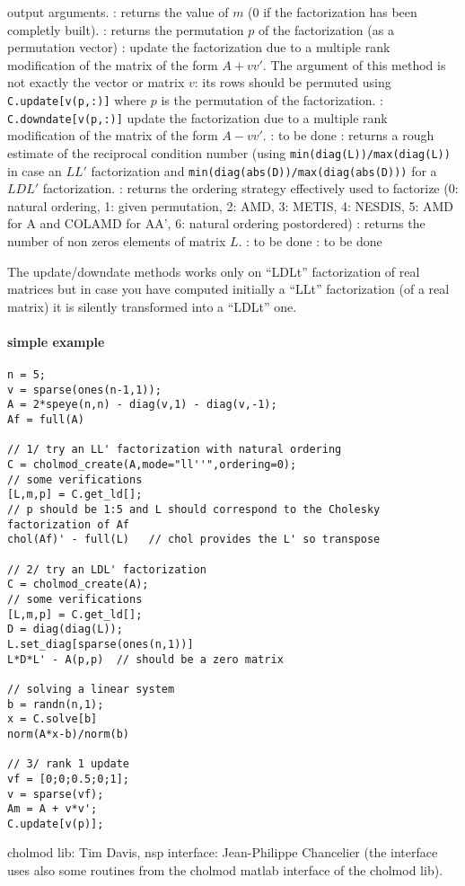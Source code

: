 \begin{varlist}
        output arguments.
  : returns the value of $m$ (0 if the factorization has been completly built).
  : returns the permutation $p$ of the factorization (as a permutation vector)         
  : update the factorization due to a multiple rank modification
        of the matrix of the form $A + vv'$. The argument of this method is not exactly the vector
        or matrix $v$: its rows should be permuted using \verb+C.update[v(p,:)]+ where $p$ is 
        the permutation of the factorization.
  : \verb+C.downdate[v(p,:)]+ update the factorization due to a multiple rank modification
        of the matrix of the form $A - vv'$.
  : to be done          
  : returns a rough estimate of the reciprocal condition number (using 
        \verb+min(diag(L))/max(diag(L))+ in case an $LL'$ factorization and 
        \verb+min(diag(abs(D))/max(diag(abs(D)))+ for a $LDL'$ factorization.
  : returns the ordering strategy effectively used to factorize
                        (0: natural ordering, 1: given permutation, 2: AMD, 3: METIS, 4: NESDIS, 5: AMD for A and COLAMD
  for AA', 6: natural ordering postordered)      
  : returns the number of non zeros elements of matrix $L$.        
  : to be done            
  : to be done         
\end{varlist}

The update/downdate methods works only on ``LDLt'' factorization of real matrices but in case you have 
computed initially a ``LLt'' factorization (of a real matrix) it is silently transformed into a ``LDLt'' one.
 
\begin{examples}
 \paragraph{simple example}
  \begin{Verbatim}
n = 5;
v = sparse(ones(n-1,1));
A = 2*speye(n,n) - diag(v,1) - diag(v,-1);
Af = full(A)

// 1/ try an LL' factorization with natural ordering
C = cholmod_create(A,mode="ll''",ordering=0);
// some verifications
[L,m,p] = C.get_ld[];
// p should be 1:5 and L should correspond to the Cholesky factorization of Af
chol(Af)' - full(L)   // chol provides the L' so transpose

// 2/ try an LDL' factorization
C = cholmod_create(A);
// some verifications
[L,m,p] = C.get_ld[];
D = diag(diag(L));
L.set_diag[sparse(ones(n,1))]
L*D*L' - A(p,p)  // should be a zero matrix 

// solving a linear system
b = randn(n,1);
x = C.solve[b]
norm(A*x-b)/norm(b)

// 3/ rank 1 update
vf = [0;0;0.5;0;1];
v = sparse(vf);
Am = A + v*v';
C.update[v(p)];

  \end{Verbatim}
 \end{examples}

\begin{authors}
   cholmod lib: Tim Davis, nsp interface: Jean-Philippe Chancelier (the interface uses also
   some routines from the cholmod matlab interface of the cholmod lib).
\end{authors}
